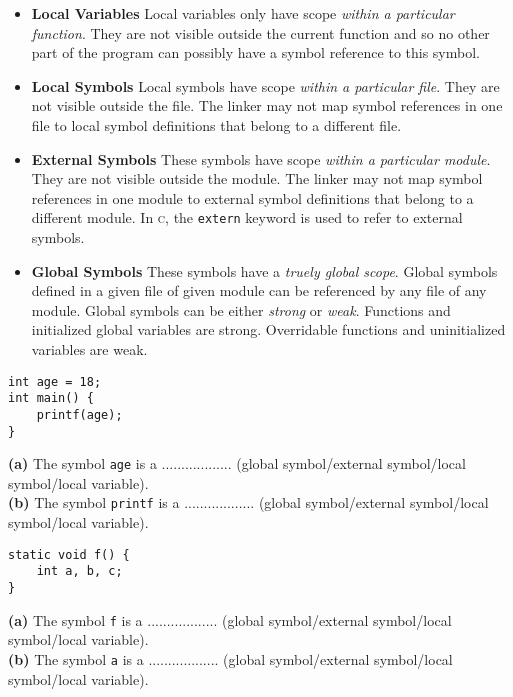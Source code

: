 \begin{itemize}   
\renewcommand{\labelitemi}{$\Box$}
\item \textbf{Local Variables}  Local variables only have scope \textit{within a particular function}. 
They are not visible outside the current function and so no other part of the program can 
possibly have a symbol reference to this symbol. 
\item \textbf{Local Symbols}  Local symbols have scope \textit{within a particular file}. 
They are not visible outside the file. The linker may not map symbol references in 
one file to local symbol definitions that belong to a different file. 
\item \textbf{External Symbols} These symbols have scope \textit{within a particular module}. 
They are not visible outside the module. The linker may not map symbol references in 
one module to external symbol definitions that belong to a different module. 
In \textsc{c}, the \lstinline{extern} keyword is used to refer to external symbols. 
\item \textbf{Global Symbols} These symbols have a \textit{truely global scope}.
Global symbols defined in a given file of given module 
can be referenced by any file of any module. 
Global symbols can be either \textit{strong} or \textit{weak}. 
Functions and initialized global variables are strong. 
Overridable functions and uninitialized variables are weak. 
\end{itemize}

\frmrule

\begin{example}

\begin{lstlisting}
int age = 18;
int main() {
    printf(age);
}
\end{lstlisting}

\textbf{(a)} The symbol \lstinline{age} is a ..................
(global symbol/external symbol/local symbol/local variable). \\
\textbf{(b)} The symbol \lstinline{printf} is a ..................
(global symbol/external symbol/local symbol/local variable).

\end{example}



\frmrule

\begin{example}

\begin{lstlisting}
static void f() { 
    int a, b, c; 
}
\end{lstlisting}

\textbf{(a)} The symbol \lstinline{f} is a ..................
(global symbol/external symbol/local symbol/local variable). \\
\textbf{(b)} The symbol \lstinline{a} is a ..................
(global symbol/external symbol/local symbol/local variable).

\end{example}

